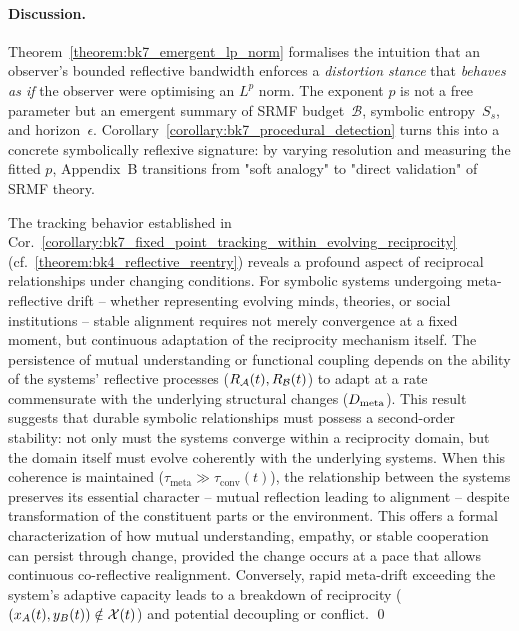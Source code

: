 \paragraph{Discussion.}
Theorem~\ref{theorem:bk7_emergent_lp_norm} formalises the intuition that an
observer's bounded reflective bandwidth enforces a \emph{distortion
stance} that \emph{behaves as if} the observer were optimising an
$L^{p}$ norm.  The exponent \(p\) is not a free parameter but an
emergent summary of SRMF budget~\(\mathcal{B}\), symbolic entropy~\(S_{s}\),
and horizon~\(\epsilon\).
Corollary~\ref{corollary:bk7_procedural_detection} turns this into a concrete
symbolically reflexive signature: by varying resolution and measuring the fitted
$p$, Appendix~B transitions from "soft analogy" to
"direct validation" of SRMF theory.

\begin{scholium}
\label{scholium:bk7_unnamed_scholium_03}
The tracking behavior established in Cor.~\ref{corollary:bk7_fixed_point_tracking_within_evolving_reciprocity} (cf.~\ref{theorem:bk4_reflective_reentry}) reveals a profound aspect of reciprocal relationships under changing conditions. For symbolic systems undergoing meta-reflective drift -- whether representing evolving minds, theories, or social institutions -- stable alignment requires not merely convergence at a fixed moment, but continuous adaptation of the reciprocity mechanism itself. The persistence of mutual understanding or functional coupling depends on the ability of the systems' reflective processes (\(R_{\mathcal{A}}(t), R_{\mathcal{B}}(t)\)) to adapt at a rate commensurate with the underlying structural changes (\(D_{\mathrm{meta}}\)).
This result suggests that durable symbolic relationships must possess a second-order stability: not only must the systems converge within a reciprocity domain, but the domain itself must evolve coherently with the underlying systems. When this coherence is maintained (\(\tau_{\mathrm{meta}} \gg \tau_{\mathrm{conv}}(t)\)), the relationship between the systems preserves its essential character -- mutual reflection leading to alignment -- despite transformation of the constituent parts or the environment. This offers a formal characterization of how mutual understanding, empathy, or stable cooperation can persist through change, provided the change occurs at a pace that allows continuous co-reflective realignment. Conversely, rapid meta-drift exceeding the system's adaptive capacity leads to a breakdown of reciprocity (\( (x_A(t), y_B(t)) \notin \mathcal{X}(t) \)) and potential decoupling or conflict. \qed
\end{scholium}
